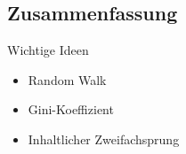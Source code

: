 \subsection{Zusammenfassung}
\begin{frame}{Wichtige Ideen}
    \begin{itemize}
        \item<1-> Random Walk
        \item<2-> Gini-Koeffizient
        \item<3-> Inhaltlicher Zweifachsprung
    \end{itemize}
\end{frame}
